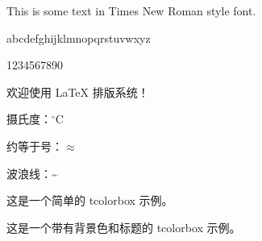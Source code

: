\documentclass{ctexart}
\begin{document}
This is some text in Times New Roman style font.

abcdefghijklmnopqrstuvwxyz

1234567890

欢迎使用 \LaTeX{} 排版系统！


摄氏度：$^\circ$C

约等于号：$\approx$

波浪线：\~{}

\begin{tcolorbox}
    这是一个简单的 tcolorbox 示例。
\end{tcolorbox}

\begin{tcolorbox}[colback=blue!5!white,colframe=blue!75!black,title=My box]
    这是一个带有背景色和标题的 tcolorbox 示例。
\end{tcolorbox}
\end{document}
